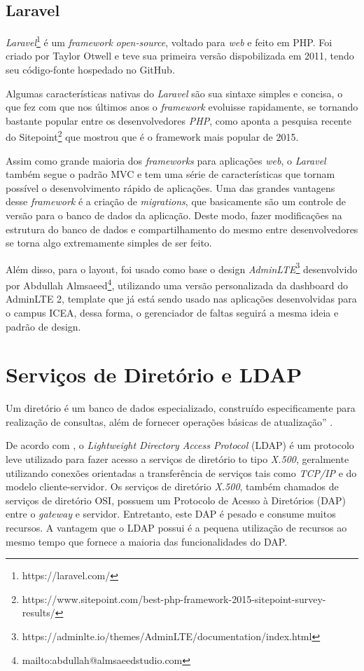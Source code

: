 \documentclass[
  12pt,       %
  openright,      %
  oneside,      %
  a4paper,      %
  english,      %
  french,        %
  spanish,     %
  brazil        %
  ]{abntex2-decsi}
\begin{document}
        \subsection{Laravel} 
		 \textit{Laravel}\footnote{https://laravel.com/} é um \textit{framework}  \textit{open-source}, voltado para \textit{web} e feito em PHP. Foi criado por Taylor Otwell e teve sua primeira versão dispobilizada em 2011,  tendo seu código-fonte hospedado no GitHub. 
         
         Algumas características nativas do \textit{Laravel} são sua sintaxe simples e concisa, o que fez com que nos últimos anos o \textit{framework} evoluisse rapidamente, se tornando bastante popular entre os desenvolvedores \textit{PHP}, como aponta a pesquisa recente do Sitepoint\footnote{https://www.sitepoint.com/best-php-framework-2015-sitepoint-survey-results/} que mostrou que é o framework mais popular de 2015.
         
         Assim como grande maioria dos \textit{frameworks} para aplicações \textit{web}, o \textit{Laravel} também segue o padrão MVC e tem uma série de características que tornam possível o desenvolvimento rápido de aplicações. Uma das grandes vantagens desse \textit{framework} é a criação de \textit{migrations}, que basicamente são um controle de versão para o banco de dados da aplicação. Deste modo, fazer modificações na estrutura do banco de dados e compartilhamento do mesmo entre desenvolvedores se torna algo extremamente simples de ser feito. 
         
         Além disso, para o layout, foi usado como base o design \textit{AdminLTE}\footnote{https://adminlte.io/themes/AdminLTE/documentation/index.html} desenvolvido por Abdullah Almsaeed\footnote{mailto:abdullah@almsaeedstudio.com}, utilizando uma versão personalizada da dashboard do AdminLTE 2, template que já está sendo usado nas aplicações desenvolvidas para o campus ICEA, dessa forma, o gerenciador de faltas seguirá a mesma ideia e padrão de design. 

    \section{Serviços de Diretório e LDAP}

        Um diretório é um banco de dados especializado, construído especificamente para realização de consultas, além de fornecer operações básicas de atualização'' \cite[p. 3, tradução nossa]{openLdap:2011}.

        De acordo com , o \textit{Lightweight Directory Access Protocol} (LDAP) é um protocolo leve utilizado para fazer acesso a serviços de diretório to tipo \textit{X.500}, geralmente utilizando conexões orientadas a transferência de serviços tais como \textit{TCP/IP} e do modelo cliente-servidor. Os serviços de diretório \textit{X.500}, também chamados de serviços de diretório OSI, possuem um Protocolo de Acesso à Diretórios (DAP) entre o \textit{gateway} e servidor. Entretanto, este DAP é pesado e consume muitos recursos. A vantagem que o LDAP possui é a pequena utilização de recursos ao mesmo tempo que fornece a maioria das funcionalidades do DAP. 
\end{document}
